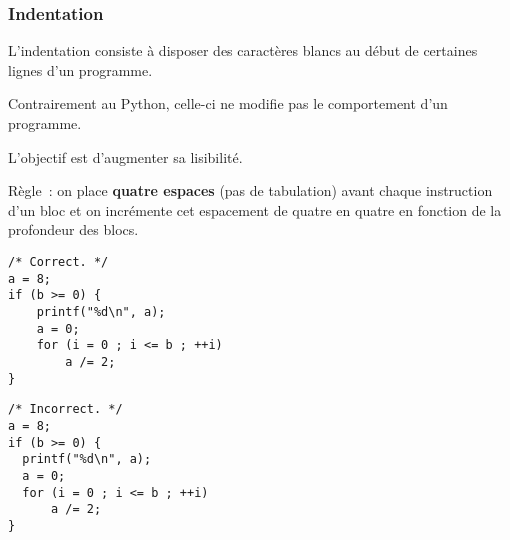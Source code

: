 \begin{frame}[fragile] \frametitle{Indentation}
L'\alert{indentation} consiste à disposer des caractères blancs au début 
de certaines lignes d'un programme. 
\medskip

Contrairement au {\sf Python}, celle-ci ne modifie pas le comportement 
d'un programme.
\medskip

L'objectif est d'augmenter sa lisibilité.
\medskip

Règle~: on place {\bf quatre espaces} (pas de tabulation) avant chaque 
instruction d'un bloc et on incrémente cet espacement de quatre en 
quatre en fonction de la profondeur des blocs.
\medskip

\begin{multicols}{2}
\begin{lstlisting}[showspaces=true]
/* Correct. */
a = 8;
if (b >= 0) {
    printf("%d\n", a);
    a = 0;
    for (i = 0 ; i <= b ; ++i)
        a /= 2;
}
\end{lstlisting}

\begin{lstlisting}[showspaces=true]
/* Incorrect. */
a = 8;
if (b >= 0) {
  printf("%d\n", a);
  a = 0;
  for (i = 0 ; i <= b ; ++i)
      a /= 2;
}
\end{lstlisting}
\end{multicols}
\end{frame}

